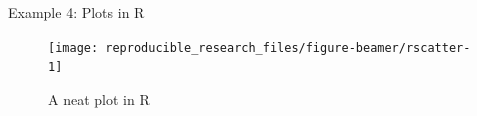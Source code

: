 \begin{frame}[fragile]{Example 4: Plots in R}

\footnotesize

\begin{Shaded}
\begin{Highlighting}[]
\StringTok{ }
\NormalTok{cols[}\NormalTok{(cols)] <-}\StringTok{ }
\StringTok{ } \NormalTok{)}
\StringTok{ }\NormalTok{(cols-vran[}\NormalTok{])/(vran[}\NormalTok{] -}\StringTok{ }\NormalTok{vran[}\NormalTok{])}
\StringTok{ }\NormalTok{(} \NormalTok{)}
\NormalTok{, }
\end{Highlighting}
\end{Shaded}

\begin{figure}
\texttt{[image: reproducible\_research\_files/figure-beamer/rscatter-1]} \caption{A neat plot in R}\label{fig:rscatter}
\end{figure}

\end{frame}
